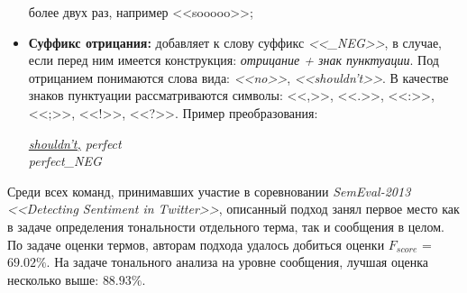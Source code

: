 \begin{itemize}
            более двух раз, например <<sooooo>>;
        \item {\bf Суффикс отрицания:} добавляет к слову суффикс {\it <<\_NEG>>},
            в случае, если перед ним имеется конструкция: {\it отрицание +
            знак пунктуации}.
            Под отрицанием понимаются слова вида: {\it<<no>>}, {\it <<shouldn't>>}.
            В качестве знаков пунктуации рассматриваются символы:
            <<,>>, <<.>>, <<:>>, <<;>>, <<!>>, <<?>>.
            Пример преобразования:
            \begin{center}
                \it
                \underline{shouldn't,} perfect \\
                perfect\_NEG
            \end{center}
    \end{itemize}

    Среди всех команд, принимавших участие в соревновании {\it SemEval-2013
    <<Detecting Sentiment in Twitter>>}, описанный подход занял первое место как
    в задаче определения тональности отдельного терма, так и сообщения в целом.
    По задаче оценки термов, авторам подхода удалось добиться оценки
    $F_{score}$ = $69.02\%$. На задаче тонального анализа на уровне сообщения,
    лучшая оценка несколько выше: $88.93\%$.
